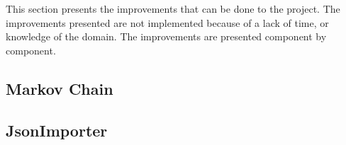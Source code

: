 
This section presents the improvements that can be done to the project. The improvements presented are not implemented because of a lack of time, or knowledge of the domain. The improvements are presented component by component.

\subsection{Markov Chain}

\label{improvement_MC}





\subsection{JsonImporter}

\label{imprevement_jsonimporter}

